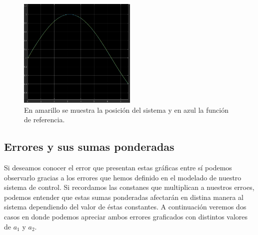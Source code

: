 \documentclass[12pt, letterpaper]{article}
\begin{document}
\begin{figure}[H]
	\centering
	\includegraphics[width=0.5\textwidth]{yrvsx.png}
	\caption{En amarillo se muestra la posición del sistema y en azul la función de referencia.}
\end{figure}

\subsection*{Errores y sus sumas ponderadas}
Si deseamos conocer el error que presentan estas gráficas entre sí podemos observarlo gracias a los errores que hemos definido en el modelado de nuestro sistema de control. Si recordamos las constanes que multiplican a nuestros erroes, podemos entender que estas sumas ponderadas afectarán en distina manera al sistema dependiendo del valor de éstas constantes. A continuación veremos dos casos en donde podemos apreciar ambos errores graficados con distintos valores de $a_1$ y $a_2$.
\end{document}
